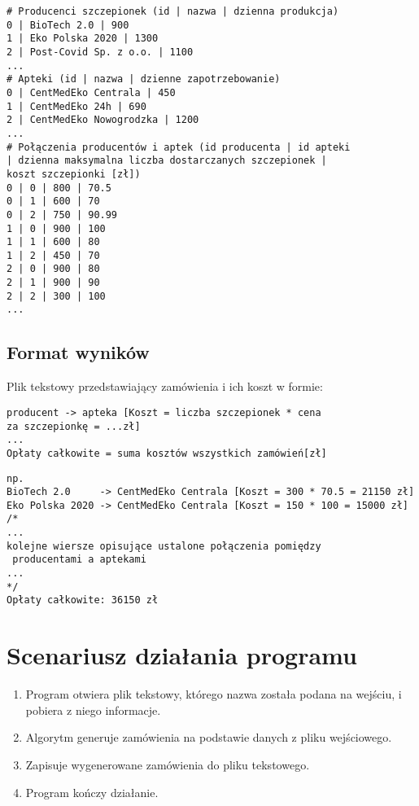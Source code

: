 \documentclass[a4paper,12pt,twoside]{article}
\begin{document}
\begin{verbatim}
# Producenci szczepionek (id | nazwa | dzienna produkcja)
0 | BioTech 2.0 | 900
1 | Eko Polska 2020 | 1300
2 | Post-Covid Sp. z o.o. | 1100
...
# Apteki (id | nazwa | dzienne zapotrzebowanie)
0 | CentMedEko Centrala | 450
1 | CentMedEko 24h | 690
2 | CentMedEko Nowogrodzka | 1200
...
# Połączenia producentów i aptek (id producenta | id apteki 
| dzienna maksymalna liczba dostarczanych szczepionek | 
koszt szczepionki [zł])
0 | 0 | 800 | 70.5
0 | 1 | 600 | 70
0 | 2 | 750 | 90.99
1 | 0 | 900 | 100
1 | 1 | 600 | 80
1 | 2 | 450 | 70
2 | 0 | 900 | 80
2 | 1 | 900 | 90
2 | 2 | 300 | 100
...
\end{verbatim}
\subsection{Format wyników}
Plik tekstowy przedstawiający zamówienia i ich koszt w formie:
\begin{verbatim}
producent -> apteka [Koszt = liczba szczepionek * cena
za szczepionkę = ...zł]
...
Opłaty całkowite = suma kosztów wszystkich zamówień[zł]
\end{verbatim}
\begin{verbatim}
np.
BioTech 2.0     -> CentMedEko Centrala [Koszt = 300 * 70.5 = 21150 zł]
Eko Polska 2020 -> CentMedEko Centrala [Koszt = 150 * 100 = 15000 zł]
/*
...
kolejne wiersze opisujące ustalone połączenia pomiędzy
 producentami a aptekami
...
*/
Opłaty całkowite: 36150 zł 
\end{verbatim}
\section{Scenariusz działania programu}
\begin{enumerate}
\item Program otwiera plik tekstowy, którego nazwa została podana na wejściu, i pobiera z niego informacje.
\item Algorytm generuje zamówienia na podstawie danych z pliku wejściowego.
\item Zapisuje wygenerowane zamówienia do pliku tekstowego.
\item Program kończy działanie.
\end{enumerate}
\end{document}
